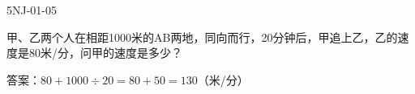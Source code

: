 \begin{defproblem}{5NJ-01-05}%
\begin{onlyproblem}%
甲、乙两个人在相距1000米的AB两地，同向而行，20分钟后，甲追上乙，乙的速度是80米/分，问甲的速度是多少？

\end{onlyproblem}%
\begin{onlysolution}%
答案：$80+1000\div 20=80+50=130$（米/分）
\end{onlysolution}%
\end{defproblem}



